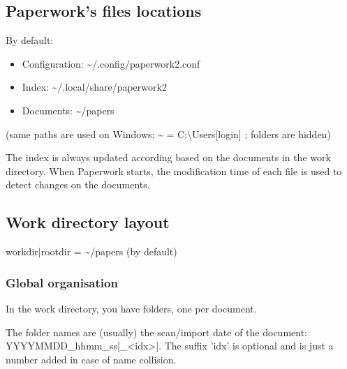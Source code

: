 \documentclass[10pt,a4paper]{article}
\begin{document}
\subsection{Paperwork's files locations}

By default:
\begin{itemize}
\item Configuration: \textasciitilde /.config/paperwork2.conf
\item Index: \textasciitilde /.local/share/paperwork2
\item Documents: \textasciitilde /papers
\end{itemize}
(same paths are used on Windows; \textasciitilde{} = C:\textbackslash Users{[}login{]}
; folders are hidden)

The index is always updated according based on the documents in the
work directory. When Paperwork starts, the modification time of each
file is used to detect changes on the documents.

\subsection{Work directory layout}

workdir$|$rootdir = \textasciitilde /papers (by default)

\subsubsection{Global organisation}

In the work directory, you have folders, one per document.

The folder names are (usually) the scan/import date of the document:
YYYYMMDD\_hhmm\_ss{[}\_<idx>{]}. The suffix 'idx' is optional and
is just a number added in case of name collision.
\end{document}
